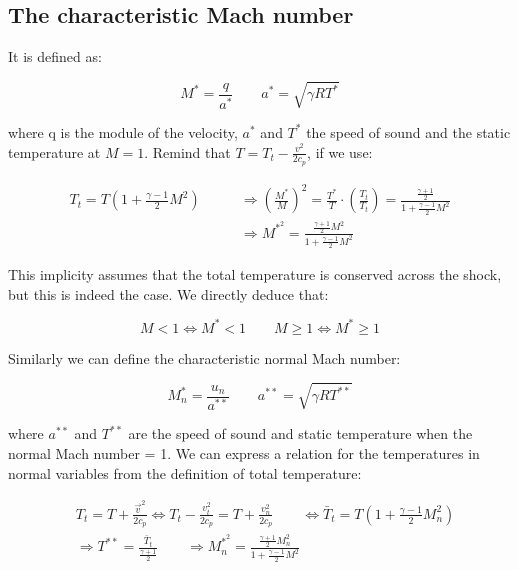 \subsection{The characteristic Mach number}
	It is defined as: 
	
	\begin{equation}
	M^* = \frac{q}{a^*} \qquad a^* = \sqrt{\gamma R T^*}
	\end{equation}
	
	where q is the module of the velocity, $a^*$ and $T^*$ the speed of sound and the static temperature at $M=1$. Remind that $T = T_t - \frac{v^2}{2c_p}$, if we use: 
	
	\begin{equation}
	\begin{aligned}
	T_t = T \left(1+ \frac{\gamma - 1}{2}M^2 \right) \qquad &\Rightarrow \left( \frac{M^*}{M}\right)^2 = \frac{T^*}{T} \cdot \left( \frac{T_t}{T_t}\right) = \frac{\frac{\gamma + 1}{2}}{1+ \frac{\gamma -1}{2}M^2}\\
	&\Rightarrow M^{*^2} =  \frac{\frac{\gamma + 1}{2}M^2}{1+ \frac{\gamma -1}{2}M^2}
	\end{aligned}
	\label{eq:8.74}
	\end{equation}
	
	This implicity assumes that the total temperature is conserved across the shock, but this is indeed the case. We directly deduce that: 
	
	\begin{equation}
	M < 1 \Leftrightarrow M^* <1 \qquad M \geq 1 \Leftrightarrow M^* \geq 1
	\label{eq:8.75}
	\end{equation}
	
	Similarly we can define the characteristic normal Mach number: 
	
	\begin{equation}
	M^*_n = \frac{u_n }{a^{**}} \qquad a^{**}  = \sqrt{\gamma R T^{**}}
	\end{equation}
	
	where $a^{**}$ and $T^{**}$ are the speed of sound and static temperature when the normal Mach number = 1. We can express a relation for the temperatures in normal variables from the definition of total temperature: 
	
	\begin{equation}
	\begin{aligned}
	&T_t = T + \frac{\vec{v}^2}{2c_p} \Leftrightarrow T_t - \frac{v_t^2}{2c_p} = T + \frac{v_n^2}{2c_p}\qquad \Leftrightarrow \bar{T}_t = T\left(1 + \frac{\gamma -1}{2}M^2_n \right)\\
	&\Rightarrow T^{**}= \frac{\bar{T}_t}{\frac{\gamma +1}{2}}\qquad \Rightarrow M^{*^2}_n = \frac{\frac{\gamma +1}{2}M^2_n}{1+ \frac{\gamma -1}{2}M^2}
	\end{aligned}
	\end{equation}
	
